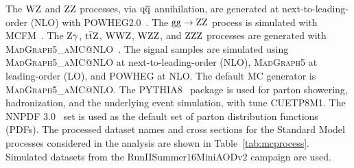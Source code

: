 The $\mathrm{W}\mathrm{Z}$ and $\mathrm{Z}\mathrm{Z}$ processes, via $\mathrm{q}\mathrm{\overline{q}}$ annihilation, 
are generated at next-to-leading-order (NLO) with 
\textsc{POWHEG2.0}~\cite{Alioli:2008gx,Nason:2004rx,Frixione:2007vw,powheg:2010}. 
The $\mathrm{g}\mathrm{g} \to \mathrm{Z}\mathrm{Z}$ process is simulated with MCFM~\cite{MCFM}. 
The $\mathrm{Z}\gamma$, ${\mathrm{t}\overline{\mathrm{t}}} \mathrm{Z}$, $\mathrm{W}\mathrm{W}\mathrm{Z}$, $\mathrm{W}\mathrm{Z}\mathrm{Z}$, and $\mathrm{Z}\mathrm{Z}\mathrm{Z}$ 
processes are generated with \textsc{MadGraph5\_aMC@NLO}~\cite{Alwall:2014hca}.
The signal samples are simulated using \textsc{MadGraph5\_aMC@NLO} at next-to-leading-order (NLO), 
\textsc{MadGraph5} at leading-order (LO), and \textsc{POWHEG} at NLO. The 
default MC generator is \textsc{MadGraph5\_aMC@NLO}. 
The \textsc{PYTHIA8}~\cite{Sjostrand:2006za,Sjostrand:2015} package is used 
for parton showering, hadronization, and the underlying event simulation,
with tune CUETP8M1.
The NNPDF 3.0~\cite{nnpdf} set is used as the default set of parton distribution 
functions (PDFs). 
The processed dataset names and cross sections for the Standard Model processes considered 
in the analysis are shown in Table~\ref{tab:mcprocess}.
Simulated datasets from the RunIISummer16MiniAODv2 campaign are used.
\clearpage
